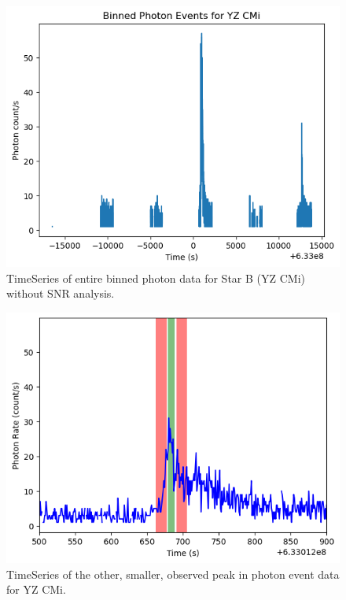 \documentclass{article}
\begin{document}
\begin{figure}[hp]
\begin{minipage}[b]{.45\linewidth}
  \end{minipage}
\end{figure}

\begin{figure}[h]
    \centering
    \includegraphics[scale=0.52]{109_ts.png}
    \caption{TimeSeries of entire binned photon data for Star B (YZ CMi) without SNR analysis.}
    \label{img:tsB}
\end{figure}

\begin{figure}[h]
    \centering
    \includegraphics[scale=0.52]{109_ts_another.png}
    \caption{TimeSeries of the other, smaller, observed peak in photon event data for YZ CMi.}
    \label{img:tsAnother}
\end{figure}
\end{document}
